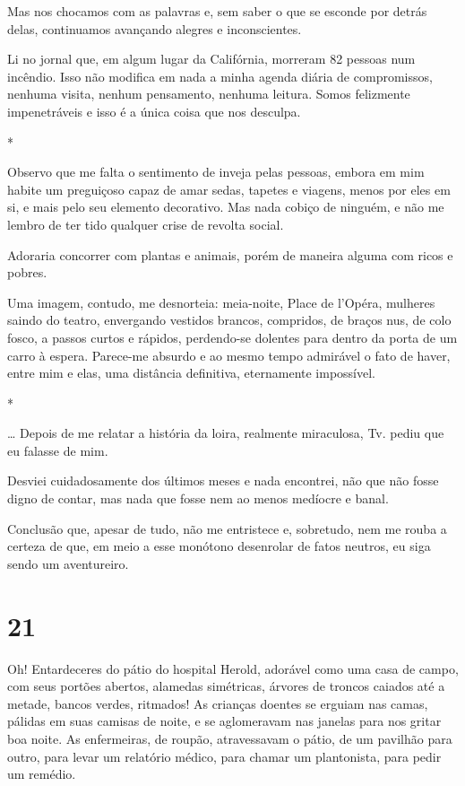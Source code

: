 Mas nos chocamos com as palavras e, sem saber o que se esconde por
detrás delas, continuamos avançando alegres e inconscientes.

Li no jornal que, em algum lugar da Califórnia, morreram 82 pessoas num
incêndio. Isso não modifica em nada a minha agenda diária de
compromissos, nenhuma visita, nenhum pensamento, nenhuma leitura. Somos
felizmente impenetráveis e isso é a única coisa que nos desculpa.

*

Observo que me falta o sentimento de inveja pelas pessoas, embora em mim
habite um preguiçoso capaz de amar sedas, tapetes e viagens, menos por
eles em si, e mais pelo seu elemento decorativo. Mas nada cobiço de
ninguém, e não me lembro de ter tido qualquer crise de revolta social.

Adoraria concorrer com plantas e animais, porém de maneira alguma com
ricos e pobres.

Uma imagem, contudo, me desnorteia: meia-noite, Place de l'Opéra,
mulheres saindo do teatro, envergando vestidos brancos, compridos, de
braços nus, de colo fosco, a passos curtos e rápidos, perdendo-se
dolentes para dentro da porta de um carro à espera. Parece-me absurdo e
ao mesmo tempo admirável o fato de haver, entre mim e elas, uma
distância definitiva, eternamente impossível.

*

\ldots{} Depois de me relatar a história da loira, realmente miraculosa,
Tv. pediu que eu falasse de mim.

Desviei cuidadosamente dos últimos meses e nada encontrei, não que não
fosse digno de contar, mas nada que fosse nem ao menos medíocre e banal.

Conclusão que, apesar de tudo, não me entristece e, sobretudo, nem me
rouba a certeza de que, em meio a esse monótono desenrolar de fatos
neutros, eu siga sendo um aventureiro.

\section{21}

Oh! Entardeceres do pátio do hospital Herold, adorável como uma casa de
campo, com seus portões abertos, alamedas simétricas, árvores de troncos
caiados até a metade, bancos verdes, ritmados! As crianças doentes se
erguiam nas camas, pálidas em suas camisas de noite, e se aglomeravam
nas janelas para nos gritar boa noite. As enfermeiras, de roupão,
atravessavam o pátio, de um pavilhão para outro, para levar um relatório
médico, para chamar um plantonista, para pedir um remédio.

